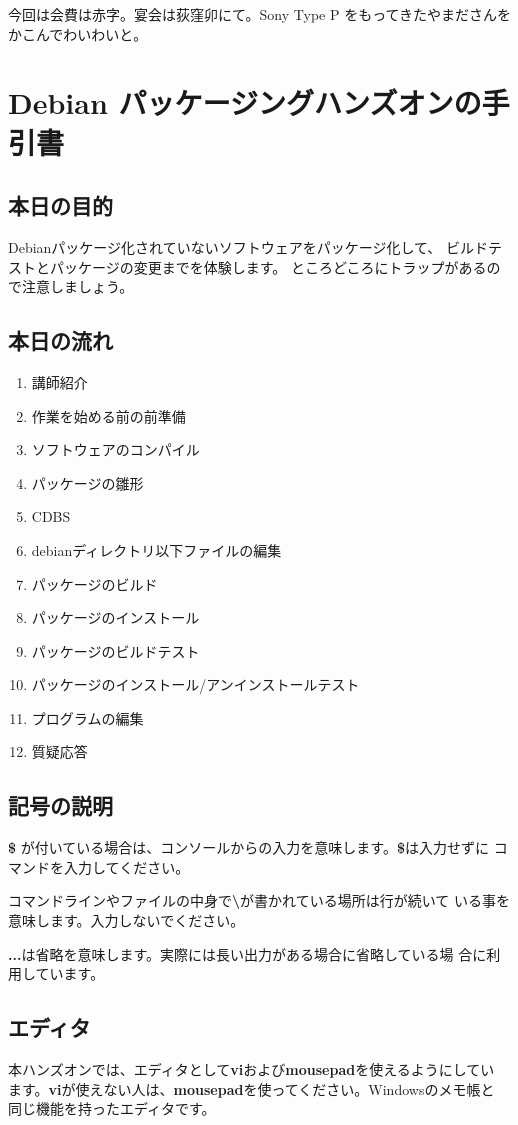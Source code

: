 \documentclass[mingoth,a4paper]{jsarticle}
\begin{document}
今回は会費は赤字。宴会は荻窪卯にて。Sony Type P をもってきたやまださんを
かこんでわいわいと。

\twocolumn
\section{Debian パッケージングハンズオンの手引書}
\subsection{本日の目的}
Debianパッケージ化されていないソフトウェアをパッケージ化して、
ビルドテストとパッケージの変更までを体験します。
ところどころにトラップがあるので注意しましょう。
\subsection{本日の流れ}
\begin{enumerate}
\item 講師紹介
\item 作業を始める前の前準備
\item ソフトウェアのコンパイル
\item パッケージの雛形
\item CDBS
\item debianディレクトリ以下ファイルの編集
\item パッケージのビルド
\item パッケージのインストール
\item パッケージのビルドテスト
\item パッケージのインストール/アンインストールテスト
\item プログラムの編集
\item 質疑応答
\end{enumerate}


\subsection{記号の説明}
{\bf \$} が付いている場合は、コンソールからの入力を意味します。{\bf \$}は入力せずに
コマンドを入力してください。

コマンドラインやファイルの中身で{\bf \textbackslash}が書かれている場所は行が続いて
いる事を意味します。入力しないでください。 

{\bf ...}は省略を意味します。実際には長い出力がある場合に省略している場
合に利用しています。

\subsection{エディタ}
本ハンズオンでは、エディタとして{\bf vi}および{\bf mousepad}を使えるようにしてい
ます。{\bf vi}が使えない人は、{\bf mousepad}を使ってください。Windowsのメモ帳と
同じ機能を持ったエディタです。
\end{document}
